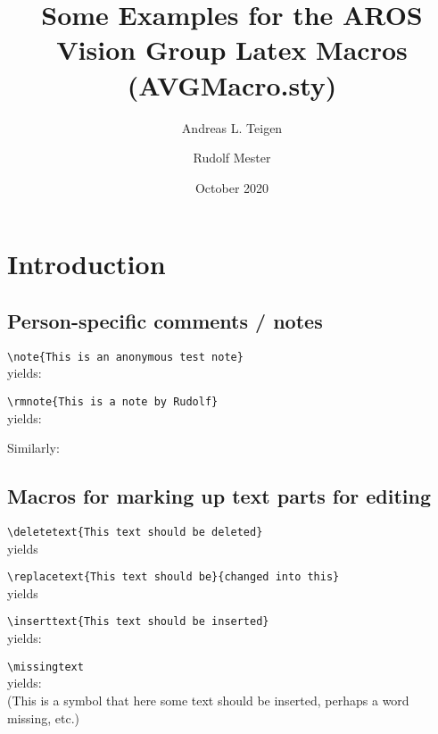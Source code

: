 \documentclass{article}
\title{Some Examples for the AROS Vision Group Latex Macros (AVGMacro.sty)}
\author{Andreas L. Teigen \and Rudolf Mester }
\date{October 2020}
\begin{document}
\maketitle

\section{Introduction}

\subsection{Person-specific comments / notes}

\verb"\note{This is an anonymous test note}"\\
yields:\\

\verb"\rmnote{This is a note by Rudolf}"\\
yields:\\

Similarly:

\subsection{Macros for marking up text parts for editing}

\bit
\item
\verb"\deletetext{This text should be deleted}"\\
yields\\

\item
\verb"\replacetext{This text should be}{changed into this}"\\
yields\\

\item
\verb"\inserttext{This text should be inserted}"\\
yields:\\

\item
\verb"\missingtext"\\
yields:\\
\missingtext \qquad \qquad(This is a symbol that here some text should be inserted, perhaps
a word missing, etc.)
\end{document}
